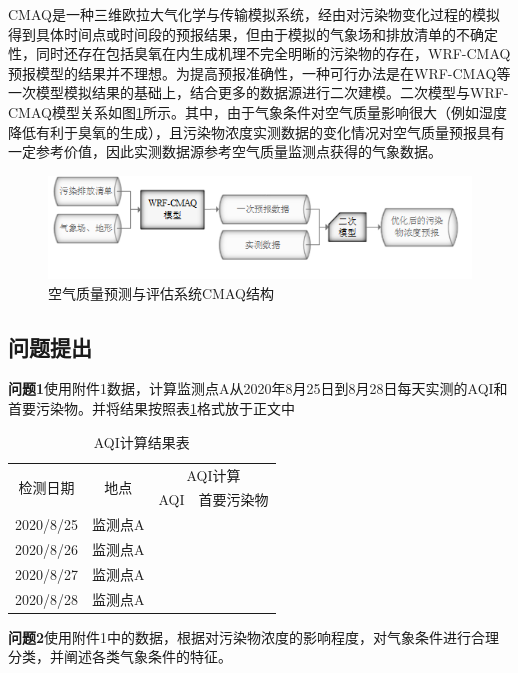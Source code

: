 \documentclass[bwprint]{gmcmthesis}
\numberwithin{figure}{section}
\begin{document}
CMAQ是一种三维欧拉大气化学与传输模拟系统，经由对污染物变化过程的模拟得到具体时间点或时间段的预报结果，但由于模拟的气象场和排放清单的不确定性，同时还存在包括臭氧在内生成机理不完全明晰的污染物的存在，WRF-CMAQ预报模型的结果并不理想。为提高预报准确性，一种可行办法是在WRF-CMAQ等一次模型模拟结果的基础上，结合更多的数据源进行二次建模。二次模型与WRF-CMAQ模型关系如图\ref{fig1-3}所示。其中，由于气象条件对空气质量影响很大（例如湿度降低有利于臭氧的生成），且污染物浓度实测数据的变化情况对空气质量预报具有一定参考价值，因此实测数据源参考空气质量监测点获得的气象数据。
\begin{figure}[!h]
	\centering
	\includegraphics[width=.7\textwidth]{figures//fig1-3.png}
	\caption{空气质量预测与评估系统CMAQ结构}
	\label{fig1-3}
\end{figure}

\subsection{问题提出}
\textbf{问题1}使用附件1数据，计算监测点A从2020年8月25日到8月28日每天实测的AQI和首要污染物。并将结果按照表\ref{tab:table1-1}格式放于正文中
\begin{table}[h!]
	\caption{AQI计算结果表}\label{tab:table1-1}
	\begin{center}
		\begin{tabular}{|c|c|c|c|}
			\hline
			\multirow{2}{*}{检测日期}&\multirow{2}{*}{地点}&\multicolumn{2}{|c|}{AQI计算} \\
			\cline{3-4}
			& &AQI&首要污染物\\
			\hline
			2020/8/25&监测点A&&\\
			\hline
			2020/8/26&监测点A&&\\
			\hline
			2020/8/27&监测点A&&\\
			\hline
			2020/8/28&监测点A&&\\
			\hline
		\end{tabular}
	\end{center}
\end{table}

\textbf{问题2}使用附件1中的数据，根据对污染物浓度的影响程度，对气象条件进行合理分类，并阐述各类气象条件的特征。
\end{document}
